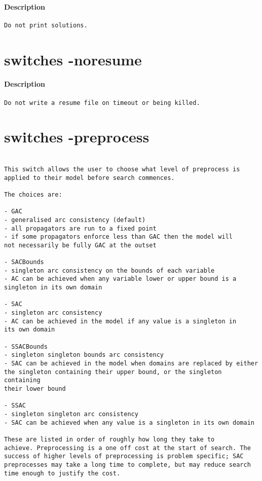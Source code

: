 \paragraph{Description}
{\footnotesize
\begin{verbatim}
Do not print solutions.
\end{verbatim}
}
\section{switches -noresume}
\paragraph{Description}
{\footnotesize
\begin{verbatim}
Do not write a resume file on timeout or being killed.
\end{verbatim}
}
\section{switches -preprocess}
\paragraph{}
{\footnotesize
\begin{verbatim}

This switch allows the user to choose what level of preprocess is
applied to their model before search commences.

The choices are:

- GAC
- generalised arc consistency (default)
- all propagators are run to a fixed point
- if some propagators enforce less than GAC then the model will
not necessarily be fully GAC at the outset

- SACBounds
- singleton arc consistency on the bounds of each variable
- AC can be achieved when any variable lower or upper bound is a
singleton in its own domain

- SAC
- singleton arc consistency
- AC can be achieved in the model if any value is a singleton in
its own domain

- SSACBounds
- singleton singleton bounds arc consistency
- SAC can be achieved in the model when domains are replaced by either
the singleton containing their upper bound, or the singleton containing
their lower bound

- SSAC
- singleton singleton arc consistency
- SAC can be achieved when any value is a singleton in its own domain

These are listed in order of roughly how long they take to
achieve. Preprocessing is a one off cost at the start of search. The
success of higher levels of preprocessing is problem specific; SAC
preprocesses may take a long time to complete, but may reduce search
time enough to justify the cost.
\end{verbatim}
}
